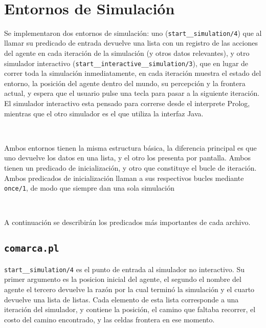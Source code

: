 \documentclass[a4paper,12pt]{report}
\begin{document}
\newpage

\

\newpage

\section{Entornos de Simulaci\'{o}n}

Se implementaron dos entornos de simulaci\'{o}n: uno (\texttt{start\_\_simulation/4}) que al llamar su predicado de
entrada devuelve una lista con un registro de las acciones del agente en cada iteraci\'{o}n de la simulaci\'{o}n (y otros
datos relevantes), y otro simulador interactivo \newline (\texttt{start\_\_interactive\_\_simulation/3}), que en lugar de
correr toda la simulaci\'{o}n inmediatamente, en cada iteraci\'{o}n muestra el estado del entorno, la posici\'{o}n del
agente dentro del mundo, su percepci\'{o}n y la frontera actual, y espera que el usuario pulse una tecla para pasar a la
siguiente iteraci\'{o}n.
El simulador interactivo esta pensado para correrse desde el interprete Prolog, mientras que el otro simulador es el que
utiliza la interfaz Java.

\

Ambos entornos tienen la misma estructura b\'{a}sica, la diferencia principal es que uno devuelve los datos en una lista,
y el otro los presenta por pantalla.
Ambos tienen un predicado de inicializaci\'{o}n, y otro que constituye el bucle de iteraci\'{o}n.
Ambos predicados de inicializaci\'{o}n llaman a sus respectivos bucles mediante \texttt{once/1}, de modo que siempre dan
una sola simulaci\'{o}n

\

A continuaci\'{o}n se describir\'{a}n los predicados m\'{a}s importantes de cada archivo.

\subsection{\texttt{comarca.pl}}

\texttt{start\_\_simulation/4} es el punto de entrada al simulador no interactivo.
Su primer argumento es la posicion inicial del agente, el segundo el nombre del agente el tercero devuelve la raz\'{o}n
por la cual termin\'{o} la simulaci\'{o}n y el cuarto devuelve una lista de listas.
Cada elemento de esta lista corresponde a una iteraci\'{o}n del simulador, y contiene la posici\'{o}n, el camino que
faltaba recorrer, el costo del camino encontrado, y las celdas frontera en ese momento.
\end{document}
